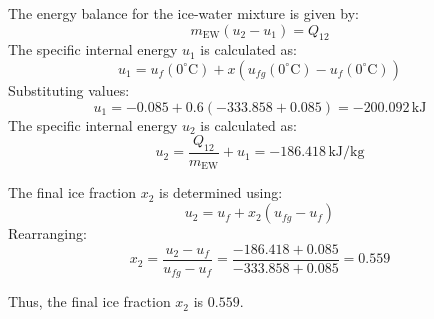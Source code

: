 The energy balance for the ice-water mixture is given by:  
\[
m_{\text{EW}} (u_2 - u_1) = Q_{12}
\]  
The specific internal energy \( u_1 \) is calculated as:  
\[
u_1 = u_f(0^\circ\text{C}) + x \left( u_{fg}(0^\circ\text{C}) - u_f(0^\circ\text{C}) \right)
\]  
Substituting values:  
\[
u_1 = -0.085 + 0.6 \left( -333.858 + 0.085 \right) = -200.092 \, \text{kJ}
\]  
The specific internal energy \( u_2 \) is calculated as:  
\[
u_2 = \frac{Q_{12}}{m_{\text{EW}}} + u_1 = -186.418 \, \text{kJ/kg}
\]  

The final ice fraction \( x_2 \) is determined using:  
\[
u_2 = u_f + x_2 \left( u_{fg} - u_f \right)
\]  
Rearranging:  
\[
x_2 = \frac{u_2 - u_f}{u_{fg} - u_f} = \frac{-186.418 + 0.085}{-333.858 + 0.085} = 0.559
\]  

Thus, the final ice fraction \( x_2 \) is \( 0.559 \).